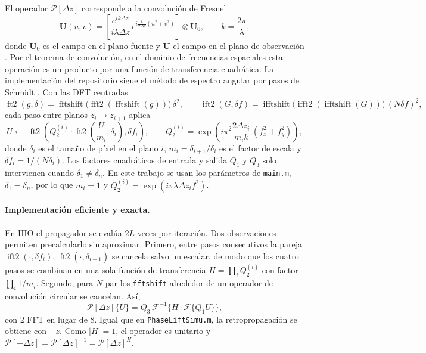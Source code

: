 \documentclass[11pt,a4paper]{article}
\newcommand{\Prop}{\mathcal{P}[\Delta z]}
\newcommand{\PropInv}{\mathcal{P}[-\Delta z]}
\newcommand{\hio}{\textsc{HIO}}
\begin{document}
El operador $\Prop$ corresponde a la convolución de Fresnel
\begin{equation}
    \mathbf{U}(u,v)=\left[\frac{e^{ik\Delta z}}{i\lambda\Delta z}\,e^{i\frac{k}{2\Delta z}(u^2+v^2)}\right]\otimes\mathbf{U}_0,
    \qquad k=\frac{2\pi}{\lambda},
    \label{eq:fresnel}
\end{equation}
donde $\mathbf{U}_0$ es el campo en el plano fuente y $\mathbf{U}$ el campo en el plano de observación \cite{goodman2005}. Por el teorema de convolución, en el dominio de frecuencias espaciales esta operación es un producto por una función de transferencia cuadrática. La implementación del repositorio sigue el método de espectro angular por pasos de Schmidt \cite{schmidt2010}. Con las DFT centradas
\begin{equation}
    \operatorname{ft2}(g,\delta)=\operatorname{fftshift}\big(\operatorname{fft2}(\operatorname{fftshift}(g))\big)\,\delta^2,
    \qquad
    \operatorname{ift2}(G,\delta f)=\operatorname{ifftshift}\big(\operatorname{ifft2}(\operatorname{ifftshift}(G))\big)\,(N\delta f)^2,
\end{equation}
cada paso entre planos $z_i\to z_{i+1}$ aplica
\begin{equation}
    U\leftarrow\operatorname{ift2}\!\left(Q_2^{(i)}\cdot\operatorname{ft2}\!\left(\frac{U}{m_i},\delta_i\right),\delta f_i\right),
    \qquad
    Q_2^{(i)}=\exp\!\left(i\pi^2\frac{2\Delta z_i}{m_i k}\,(f_x^2+f_y^2)\right),
    \label{eq:q2}
\end{equation}
donde $\delta_i$ es el tamaño de píxel en el plano $i$, $m_i=\delta_{i+1}/\delta_i$ es el factor de escala y $\delta f_i=1/(N\delta_i)$. Los factores cuadráticos de entrada y salida $Q_1$ y $Q_3$ solo intervienen cuando $\delta_1\neq\delta_n$. En este trabajo se usan los parámetros de \texttt{main.m}, $\delta_1=\delta_n$, por lo que $m_i=1$ y $Q_2^{(i)}=\exp(i\pi\lambda\Delta z_i f^2)$.

\paragraph{Implementación eficiente y exacta.} En \hio{} el propagador se evalúa $2L$ veces por iteración. Dos observaciones permiten precalcularlo sin aproximar. Primero, entre pasos consecutivos la pareja $\operatorname{ift2}(\cdot,\delta f_i)$, $\operatorname{ft2}(\cdot,\delta_{i+1})$ se cancela salvo un escalar, de modo que los cuatro pasos se combinan en una sola función de transferencia $H=\prod_i Q_2^{(i)}$ con factor $\prod_i 1/m_i$. Segundo, para $N$ par los \texttt{fftshift} alrededor de un operador de convolución circular se cancelan. Así,
\begin{equation}
    \Prop\{U\}=Q_3\,\mathcal{F}^{-1}\big\{H\cdot\mathcal{F}\{Q_1U\}\big\},
    \label{eq:prop-rapido}
\end{equation}
con 2 FFT en lugar de 8. Igual que en \texttt{PhaseLiftSimu.m}, la retropropagación se obtiene con $-z$. Como $|H|=1$, el operador es unitario y $\PropInv=\Prop^{-1}=\Prop^{H}$.
\end{document}
